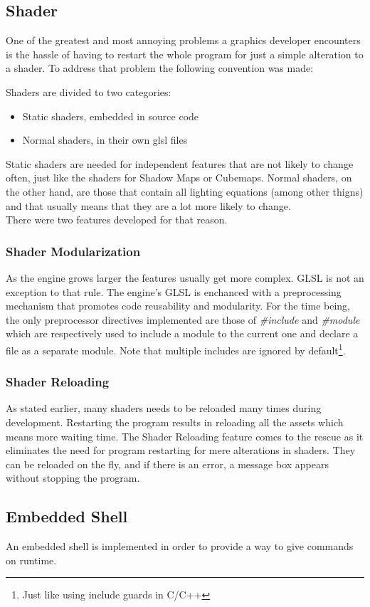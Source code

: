 \subsection{Shader}
One of the greatest and most annoying problems a graphics developer encounters is the hassle of
having to restart the whole program for just a simple alteration to a shader. To address that
problem the following convention was made:

\noindent Shaders are divided to two categories:

\begin{itemize}
\item Static shaders, embedded in source code
\item Normal shaders, in their own glsl files
\end{itemize}

\noindent Static shaders are needed for independent features that are not likely to change often,
just like the shaders for Shadow Maps or Cubemaps. Normal shaders, on the other hand, are those
that contain all lighting equations (among other thigns) and that usually means that they are a
lot more likely to change.\\
There were two features developed for that reason.

\subsubsection{Shader Modularization}
As the engine grows larger the features usually get more complex. GLSL is not an exception to that
rule. The engine's GLSL is enchanced with a preprocessing mechanism that promotes code reusability
and modularity. For the time being, the only preprocessor directives implemented are those of
\textit{\#include} and \textit{\#module} which are respectively used to include a module to the
current one and declare a file as a separate module. Note that multiple includes are ignored by
default\footnote{Just like using include guards in C/C++}.

\subsubsection{Shader Reloading}
As stated earlier, many shaders needs to be reloaded many times during development. Restarting
the program results in reloading all the assets which means more waiting time. The Shader Reloading feature
comes to the rescue as it eliminates the need for program restarting for mere alterations in shaders.
They can be reloaded on the fly, and if there is an error, a message box appears without stopping
the program.

\subsection{Embedded Shell}
An embedded shell is implemented in order to provide a way to give commands on runtime.
